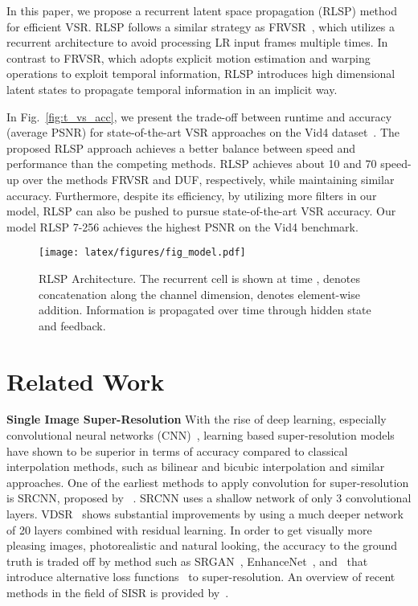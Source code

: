 \documentclass[10pt,twocolumn,letterpaper]{article}
\begin{document}
 In this paper, we propose a recurrent latent space propagation (RLSP) method for efficient VSR.
RLSP follows a similar strategy as FRVSR~\cite{frvsr}, which utilizes a recurrent architecture to avoid processing LR input frames multiple times. 
In contrast to FRVSR, which adopts explicit motion estimation and warping operations to exploit temporal information, RLSP introduces high dimensional latent states to propagate temporal information in an implicit way.


In Fig.~\ref{fig:t_vs_acc}, we present the trade-off between runtime and accuracy (average PSNR) for state-of-the-art VSR approaches on the Vid4 dataset~\cite{bayes}.
The proposed RLSP approach achieves a better balance between speed and performance than the competing methods.
RLSP achieves about 10 and 70 speed-up over the methods FRVSR and DUF, respectively, while maintaining similar accuracy.
Furthermore, despite its efficiency, by utilizing more filters in our model, RLSP can also be pushed to pursue state-of-the-art VSR accuracy.
Our model RLSP 7-256 achieves the highest PSNR on the Vid4 benchmark.
















\begin{figure*}
\begin{center}
\texttt{[image: latex/figures/fig\_model.pdf]}
\end{center}
   \caption{RLSP Architecture. The recurrent cell is shown at time ,  denotes concatenation along the channel dimension,  denotes element-wise addition. Information is propagated over time through hidden state  and feedback.}
\label{fig:model}
\end{figure*}



\section{Related Work}
\noindent
\textbf{Single Image Super-Resolution}
\newline
With the rise of deep learning, especially convolutional neural networks (CNN)~\cite{imagenet}, learning based super-resolution models have shown to be superior in terms of accuracy compared to classical interpolation methods, such as bilinear and bicubic interpolation and similar approaches. One of the earliest methods to apply convolution for super-resolution is SRCNN, proposed by ~\cite{srcnn}. SRCNN uses a shallow network of only 3 convolutional layers. VDSR~\cite{vdsr} shows substantial improvements by using a much deeper network of 20 layers combined with residual learning. In order to get visually more pleasing images, photorealistic and natural looking, the accuracy to the ground truth is traded off by method such as SRGAN~\cite{srgan}, EnhanceNet~\cite{enhancenet}, and~\cite{photogan, dahl, lucas} that introduce alternative loss functions~\cite{gan} to super-resolution. An overview of recent methods in the field of SISR is provided by~\cite{timofte_challenge}.
\end{document}
